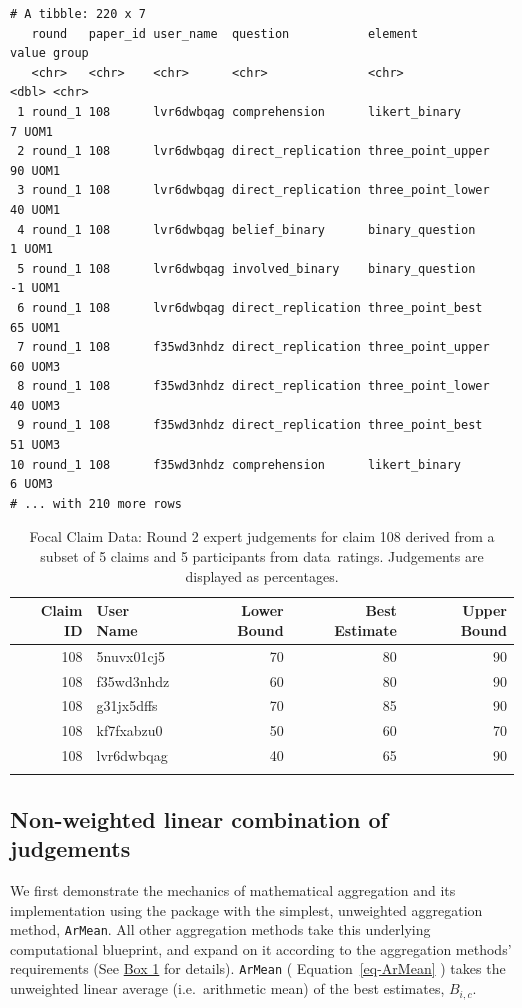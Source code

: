 \documentclass[article]{jss}
\begin{document}
\begin{verbatim}
# A tibble: 220 x 7
   round   paper_id user_name  question           element           value group
   <chr>   <chr>    <chr>      <chr>              <chr>             <dbl> <chr>
 1 round_1 108      lvr6dwbqag comprehension      likert_binary         7 UOM1 
 2 round_1 108      lvr6dwbqag direct_replication three_point_upper    90 UOM1 
 3 round_1 108      lvr6dwbqag direct_replication three_point_lower    40 UOM1 
 4 round_1 108      lvr6dwbqag belief_binary      binary_question       1 UOM1 
 5 round_1 108      lvr6dwbqag involved_binary    binary_question      -1 UOM1 
 6 round_1 108      lvr6dwbqag direct_replication three_point_best     65 UOM1 
 7 round_1 108      f35wd3nhdz direct_replication three_point_upper    60 UOM3 
 8 round_1 108      f35wd3nhdz direct_replication three_point_lower    40 UOM3 
 9 round_1 108      f35wd3nhdz direct_replication three_point_best     51 UOM3 
10 round_1 108      f35wd3nhdz comprehension      likert_binary         6 UOM3 
# ... with 210 more rows
\end{verbatim}

\hypertarget{tbl-focal-claim}{}
\begin{longtable}{rlrrr}

\toprule
Claim ID & User Name & Lower Bound & Best Estimate & Upper Bound \\ 
\midrule
108 & 5nuvx01cj5 & 70 & 80 & 90 \\ 
108 & f35wd3nhdz & 60 & 80 & 90 \\ 
108 & g31jx5dffs & 70 & 85 & 90 \\ 
108 & kf7fxabzu0 & 50 & 60 & 70 \\ 
108 & lvr6dwbqag & 40 & 65 & 90 \\ 
\bottomrule
\caption{\label{tbl-focal-claim}Focal Claim Data: Round 2 expert judgements for claim 108 derived from a
subset of 5 claims and 5 participants from data~ratings. Judgements are
displayed as percentages. }\tabularnewline
\end{longtable}

\hypertarget{sec-AverageWAgg}{%
\subsection{Non-weighted linear combination of
judgements}\label{sec-AverageWAgg}}

We first demonstrate the mechanics of mathematical aggregation and its
implementation using the  package with the simplest,
unweighted aggregation method, \texttt{ArMean}. All other aggregation
methods take this underlying computational blueprint, and expand on it
according to the aggregation methods' requirements (See
\protect\hyperlink{aggWorkflow}{Box 1} for details). \texttt{ArMean} (
Equation~\ref{eq-ArMean} ) takes the unweighted linear average
(i.e.~arithmetic mean) of the best estimates, \(B_{i,c}\).
\end{document}

